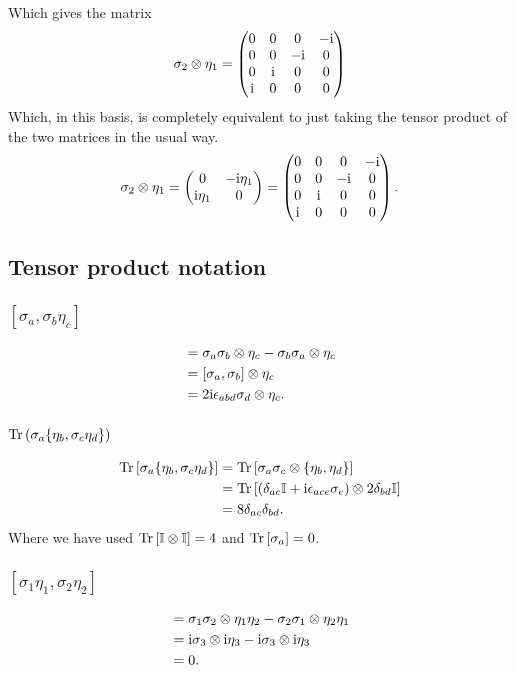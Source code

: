 \documentclass[main.tex]{subfiles}
\begin{document}
Which gives the matrix
\begin{equation}
\sigma_2\otimes\eta_1=\begin{pmatrix}0&0&0&-\mathrm{i}\\0&0&-\mathrm{i}&0\\0&\mathrm{i}&0&0\\\mathrm{i}&0&0&0\end{pmatrix}
\end{equation}
Which, in this basis, is completely equivalent to just taking the tensor product of the two matrices in the usual way.
\begin{equation}
\sigma_2\otimes\eta_1=\begin{pmatrix}0&-\mathrm{i}\eta_1\\\mathrm{i}\eta_1&0\end{pmatrix}=\begin{pmatrix}0&0&0&-\mathrm{i}\\0&0&-\mathrm{i}&0\\0&\mathrm{i}&0&0\\\mathrm{i}&0&0&0\end{pmatrix}.
\end{equation}
\subsection{Tensor product notation}
\subsubsection{$[\sigma_a,\sigma_b\eta_c]$}
\begin{align}
[\sigma_a,\sigma_b\eta_c]&=\sigma_a\sigma_b\otimes\eta_c-\sigma_b\sigma_a\otimes\eta_c\\
&=[\sigma_a,\sigma_b]\otimes\eta_c\\
&=2\img\epsilon_{abd}\sigma_d\otimes\eta_c.
\end{align}
\subsubsection{$\operatorname{Tr}{(\sigma_a\{\eta_b,\sigma_c\eta_d\})}$}
\begin{align}
\operatorname{Tr}{[\sigma_a\{\eta_b,\sigma_c\eta_d\}]}&=\operatorname{Tr}{[\sigma_a\sigma_c\otimes\{\eta_b,\eta_d\}]}\\
&=\operatorname{Tr}{[(\delta_{ac}\mathbb{I}+\mathrm{i}\epsilon_{ace}\sigma_e)\otimes2\delta_{bd}\mathbb{I}]}\\
&=8\delta_{ac}\delta_{bd}.
\end{align}
Where we have used $\operatorname{Tr}{[\mathbb{I}\otimes\mathbb{I}]}=4$ and $\operatorname{Tr}{[\sigma_a]}=0$.
\subsubsection{$[\sigma_1\eta_1,\sigma_2\eta_2]$}
\begin{align}
[\sigma_1\eta_1,\sigma_2\eta_2]&=\sigma_1\sigma_2\otimes\eta_1\eta_2-\sigma_2\sigma_1\otimes\eta_2\eta_1\\
&=\img\sigma_3\otimes\img\eta_3-\img\sigma_3\otimes\img\eta_3\\
&=0.
\end{align}
\end{document}
